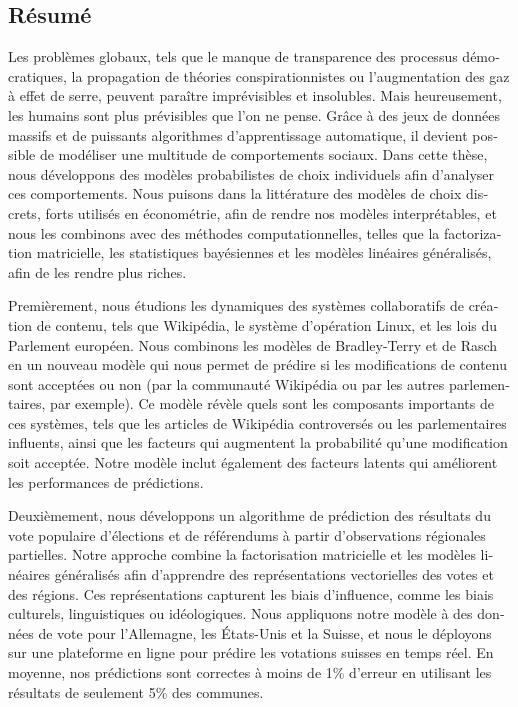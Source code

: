 \begin{otherlanguage}{french}
	\chapter*{Résumé}

	Les problèmes globaux, tels que le manque de transparence des processus démocratiques, la propagation de théories conspirationnistes ou l'augmentation des gaz à effet de serre, peuvent paraître imprévisibles et insolubles.
	Mais heureusement, les humains sont plus prévisibles que l'on ne pense.
	Grâce à des jeux de données massifs et de puissants algorithmes d'apprentissage automatique, il devient possible de modéliser une multitude de comportements sociaux.
	Dans cette thèse, nous développons des modèles probabilistes de choix individuels afin d'analyser ces comportements.
	Nous puisons dans la littérature des modèles de choix discrets, forts utilisés en économétrie, afin de rendre nos modèles interprétables, et nous les combinons avec des méthodes computationnelles, telles que la factorization matricielle, les statistiques bayésiennes et les modèles linéaires généralisés, afin de les rendre plus riches.

	Premièrement, nous étudions les dynamiques des systèmes collaboratifs de création de contenu, tels que Wikipédia, le système d'opération Linux, et les lois du Parlement européen.
	Nous combinons les modèles de Bradley-Terry et de Rasch en un nouveau modèle qui nous permet de prédire si les modifications de contenu sont acceptées ou non (par la communauté Wikipédia ou par les autres parlementaires, par exemple).
	Ce modèle révèle quels sont les composants importants de ces systèmes, tels que les articles de Wikipédia controversés ou les parlementaires influents, ainsi que les facteurs qui augmentent la probabilité qu'une modification soit acceptée.
	Notre modèle inclut également des facteurs latents qui améliorent les performances de prédictions.

	Deuxièmement, nous développons un algorithme de prédiction des résultats du vote populaire d'élections et de référendums à partir d'observations régionales partielles.
	Notre approche combine la factorisation matricielle et les modèles linéaires généralisés afin d'apprendre des représentations vectorielles des votes et des régions.
	Ces représentations capturent les biais d'influence, comme les biais culturels, linguistiques ou idéologiques.
	Nous appliquons notre modèle à des données de vote pour l'Allemagne, les États-Unis et la Suisse, et nous le déployons sur une plateforme en ligne pour prédire les votations suisses en temps réel.
	En moyenne, nos prédictions sont correctes à moins de 1\% d'erreur en utilisant les résultats de seulement 5\% des communes.


\end{otherlanguage}
